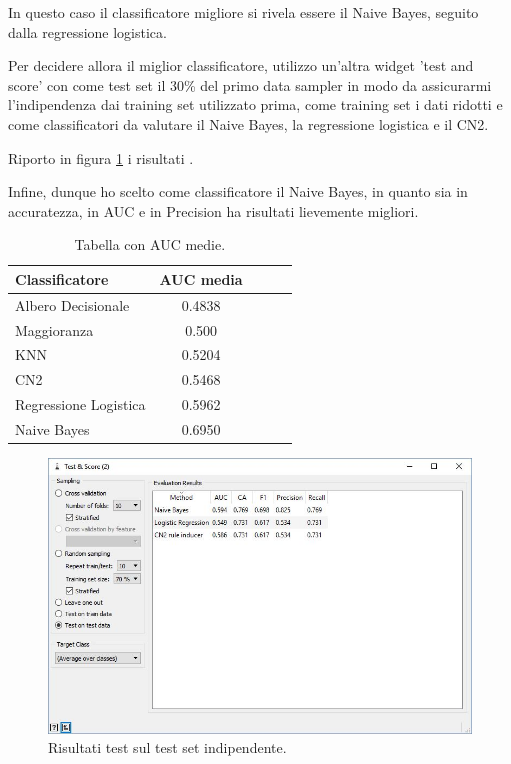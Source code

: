 \documentclass[a4paper, 12p]{report}
\begin{document}
In questo caso il classificatore migliore si rivela essere il Naive Bayes, seguito dalla regressione logistica.

Per decidere allora il miglior classificatore, utilizzo un'altra widget 'test and score' con come test set il 30\% del primo data sampler in modo da assicurarmi l'indipendenza dai training set utilizzato prima, come training set i dati ridotti e come classificatori da valutare il Naive Bayes, la regressione logistica e il CN2.

Riporto in figura \ref{fig:8} i risultati . 

Infine, dunque ho scelto come classificatore il Naive Bayes, in quanto sia in accuratezza, in AUC e in Precision ha risultati lievemente migliori.

\begin{table}
\centering
\caption{Tabella con AUC medie.}
\label{tab:2}
\begin{tabular}{|l|c|c|c|l|}
\hline
Classificatore & AUC media\\
\hline
Albero Decisionale & 0.4838\\
\hline
Maggioranza & 0.500\\
\hline
KNN & 0.5204\\
\hline
CN2 & 0.5468\\
\hline
Regressione Logistica & 0.5962 \\
\hline
Naive Bayes & 0.6950 \\
\hline
\end{tabular}
\end{table}
\begin{figure}	
	\centering
	\includegraphics[scale = 0.5]{img/score.JPG}
	\caption{Risultati test sul test set indipendente.}\label{fig:8}
\end{figure}
\end{document}
